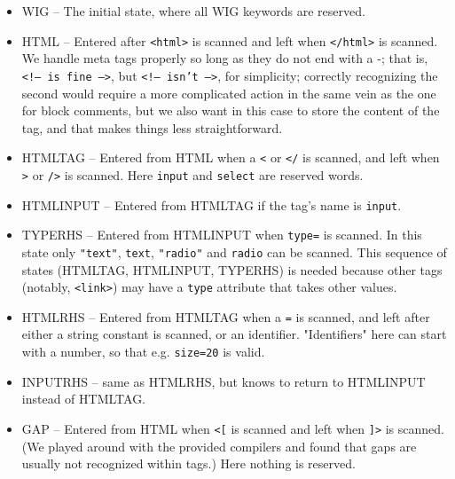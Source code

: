 \documentclass{WigReport}
\begin{document}
\begin{itemize}

\item WIG -- The initial state, where all WIG keywords are reserved.

\item HTML -- Entered after {\tt <html>} is scanned and left when 
              {\tt </html>} is scanned. We handle meta tags properly so 
              long as they do not end with a -; that is, 
              {\tt <!-- is fine -->}, but {\tt <!-- isn't --->}, for 
              simplicity; correctly recognizing the second would require a 
              more complicated action in the same vein as the one for block
              comments, but we also want in this case to store the content
              of the tag, and that makes things less straightforward.

\item HTMLTAG -- Entered from HTML when a {\tt <} or {\tt </} is scanned, 
                 and left when {\tt >} or {\tt />} is scanned. Here 
                 {\tt input} and {\tt select} are reserved words.

\item HTMLINPUT -- Entered from HTMLTAG if the tag's name is {\tt input}.

\item TYPERHS -- Entered from HTMLINPUT when {\tt type=} is scanned. In
                 this state only {\tt "text"}, {\tt text}, {\tt "radio"} 
                 and {\tt radio} can be scanned. This sequence of states 
                 (HTMLTAG, HTMLINPUT, TYPERHS) is needed because other tags
                 (notably, {\tt <link>}) may have a {\tt type} attribute 
                 that takes other values.

\item HTMLRHS -- Entered from HTMLTAG when a {\tt =} is scanned, and left 
                 after either a string constant is scanned, or an 
                 identifier.  "Identifiers" here can start with a number, 
                 so that e.g.  {\tt size=20} is valid.

\item INPUTRHS -- same as HTMLRHS, but knows to return to HTMLINPUT instead
                  of HTMLTAG.

\item GAP -- Entered from HTML when {\tt <{[}} is scanned and left when 
       {\tt {]}>} is scanned.  (We played around with the provided 
       compilers and found that gaps are usually not recognized within 
       tags.) Here nothing is reserved.  

\end{itemize}
\end{document}
